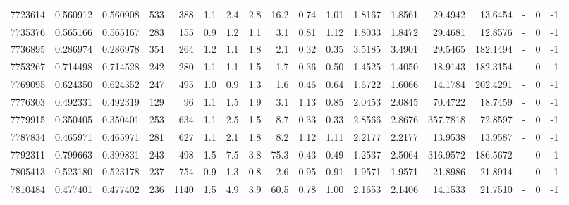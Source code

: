 \begin{tabular}{rrrrrrrrrrrrrrrlrr}
   7723614 & 0.560912 &   0.560908 &  533 &  388 &      1.1 &      2.4 &     2.8 &     16.2 &       0.74 &        1.01 &  1.8167 &  1.8561 &   29.4942 &   13.6454 &             - &        0 &         -1 \\
   7735376 & 0.565166 &   0.565167 &  283 &  155 &      0.9 &      1.2 &     1.1 &      3.1 &       0.81 &        1.12 &  1.8033 &  1.8472 &   29.4681 &   12.8576 &             - &        0 &         -1 \\
   7736895 & 0.286974 &   0.286978 &  354 &  264 &      1.2 &      1.1 &     1.8 &      2.1 &       0.32 &        0.35 &  3.5185 &  3.4901 &   29.5465 &  182.1494 &             - &        0 &         -1 \\
   7753267 & 0.714498 &   0.714528 &  242 &  280 &      1.1 &      1.1 &     1.5 &      1.7 &       0.36 &        0.50 &  1.4525 &  1.4050 &   18.9143 &  182.3154 &             - &        0 &         -1 \\
   7769095 & 0.624350 &   0.624352 &  247 &  495 &      1.0 &      0.9 &     1.3 &      1.6 &       0.46 &        0.64 &  1.6722 &  1.6066 &   14.1784 &  202.4291 &             - &        0 &         -1 \\
   7776303 & 0.492331 &   0.492319 &  129 &   96 &      1.1 &      1.5 &     1.9 &      3.1 &       1.13 &        0.85 &  2.0453 &  2.0845 &   70.4722 &   18.7459 &             - &        0 &         -1 \\
   7779915 & 0.350405 &   0.350401 &  253 &  634 &      1.1 &      2.5 &     1.5 &      8.7 &       0.33 &        0.33 &  2.8566 &  2.8676 &  357.7818 &   72.8597 &             - &        0 &         -1 \\
   7787834 & 0.465971 &   0.465971 &  281 &  627 &      1.1 &      2.1 &     1.8 &      8.2 &       1.12 &        1.11 &  2.2177 &  2.2177 &   13.9538 &   13.9587 &             - &        0 &         -1 \\
   7792311 & 0.799663 &   0.399831 &  243 &  498 &      1.5 &      7.5 &     3.8 &     75.3 &       0.43 &        0.49 &  1.2537 &  2.5064 &  316.9572 &  186.5672 &             - &        0 &         -1 \\
   7805413 & 0.523180 &   0.523178 &  237 &  754 &      0.9 &      1.3 &     0.8 &      2.6 &       0.95 &        0.91 &  1.9571 &  1.9571 &   21.8986 &   21.8914 &             - &        0 &         -1 \\
   7810484 & 0.477401 &   0.477402 &  236 & 1140 &      1.5 &      4.9 &     3.9 &     60.5 &       0.78 &        1.00 &  2.1653 &  2.1406 &   14.1533 &   21.7510 &             - &        0 &         -1 \\

\end{tabular}
